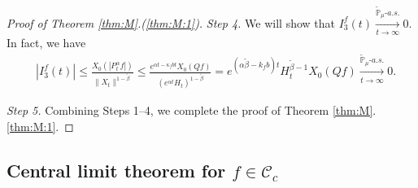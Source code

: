 \documentclass[12pt,a4paper]{amsart}
\theoremstyle{plain}
\theoremstyle{definition}
\numberwithin{equation}{section}
\begin{document}
\begin{proof}[Proof of Theorem \ref{thm:M}.(\ref{thm:M:1})]
	\emph{Step 4.} We will show that $I^f_3(t) \xrightarrow[t\to \infty]{\widetilde {\mathbb P}_\mu \text{-} a.s.} 0$.
  In fact, we have
  \begin{align}
    & |I^f_3(t)|
      \leq \frac{X_0(|P^\alpha_tf|)}{\|X_t\|^{1 - \tilde \beta }}
      \leq \frac{e^{\alpha t - \kappa_f b t}X_0(Qf)}{(e^{\alpha t} H_t)^{1 - \tilde \beta}}
      = e^{(\alpha \tilde \beta - k_fb)t} H_t^{\tilde \beta - 1} X_0(Qf)
      \xrightarrow[t\to \infty]{\widetilde {\mathbb P}_\mu \text{-} a.s.} 0.
  \end{align}

  \emph{Step 5.} Combining Steps 1--4, we complete the proof of Theorem  \ref{thm:M}.\eqref{thm:M:1}.
\end{proof}

\subsection{Central limit theorem for $f \in \mathcal C_c$}
\end{document}
